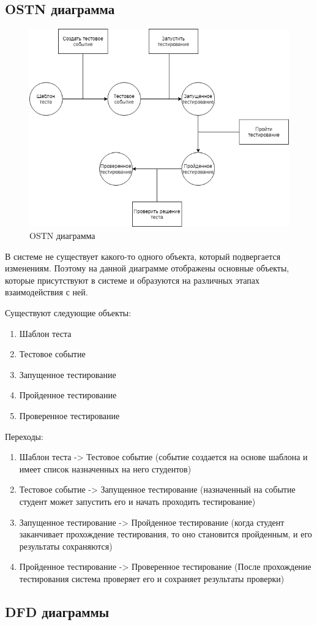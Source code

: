 \subsection{OSTN диаграмма}
\begin{figure}[H]
    \includegraphics[width=\textwidth, center]{../img/OSTN.png}
    \caption{OSTN диаграмма}
\end{figure}

В системе не существует какого-то одного объекта, который подвергается изменениям.
Поэтому на данной диаграмме отображены основные объекты, которые присутствуют в
системе и образуются на различных этапах взаимодействия с ней.

Существуют следующие объекты:
\begin{enumerate}
    \item Шаблон теста
    \item Тестовое событие
    \item Запущенное тестирование
    \item Пройденное тестирование
    \item Проверенное тестирование
\end{enumerate}

Переходы:
\begin{enumerate}
    \item Шаблон теста -> Тестовое событие (событие создается на основе шаблона
    и имеет список назначенных на него студентов)
    \item Тестовое событие -> Запущенное тестирование (назначенный на событие студент
    может запустить его и начать проходить тестирование)
    \item Запущенное тестирование -> Пройденное тестирование (когда студент заканчивает
    прохождение тестирования, то оно становится пройденным, и его результаты сохраняются)
    \item Пройденное тестирование -> Проверенное тестирование (После прохождение тестирования
    система проверяет его и сохраняет результаты проверки)
\end{enumerate}


\subsection{DFD диаграммы}